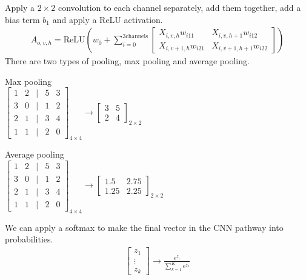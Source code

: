 \documentclass[12pt, letterpaper]{article}
\begin{document}
Apply a $2\times 2$ convolution to each channel separately, add  them together, add a bias term
$b_1$ and apply a ReLU activation. 
\begin{align*}
    A_{o,v,h} = \text{ReLU} \left(w_0 + \sum_{i=0}^{3 \text{channels}} \begin{bmatrix}
        X_{i,v,h}w_{i11} & X_{i,v,h+1}w_{i12} \\ X_{i,v+1,h}w_{i21} & X_{i,v+1,h+1}w_{i22}
    \end{bmatrix}\right)
\end{align*}
There are two types of pooling, max pooling and average pooling.
\begin{center}
    Max pooling \\
    $\begin{bmatrix}
        1 & 2 &| & 5 & 3 \\
        3 & 0 &| & 1 & 2 \\
        \hline
        2 & 1 &| & 3 & 4 \\
        1 & 1 &| & 2 & 0
    \end{bmatrix}_{4 \times 4} \rightarrow 
    \begin{bmatrix}
        3 & 5 \\
        2 & 4
    \end{bmatrix}_{2\times 2}$ \\
\end{center}
\begin{center}
    Average pooling \\
    $\begin{bmatrix}
        1 & 2 &| & 5 & 3 \\
        3 & 0 &| & 1 & 2 \\
        \hline
        2 & 1 &| & 3 & 4 \\
        1 & 1 &| & 2 & 0
    \end{bmatrix}_{4\times 4} \rightarrow 
    \begin{bmatrix}
        1.5 & 2.75 \\
        1.25 & 2.25
    \end{bmatrix}_{2\times 2}$
\end{center}
We can apply a softmax to make the final vector in the CNN pathway into probabilities.
\begin{align*}
    \begin{bmatrix}
        z_1 \\ \vdots \\ z_k
    \end{bmatrix} \rightarrow
    \frac{e^{z_i}}{\sum_{k=1}^{K}e^{z_k}}
\end{align*}
\end{document}
